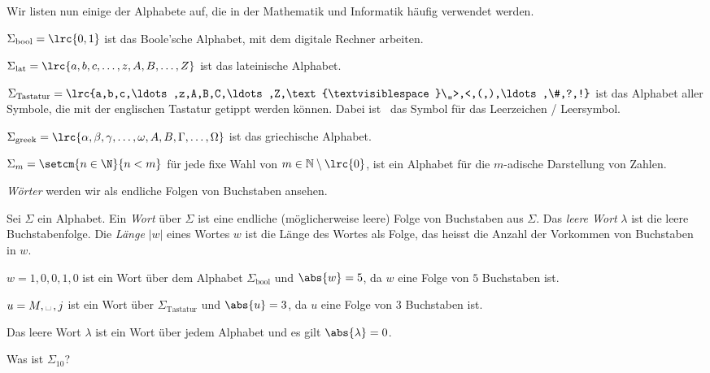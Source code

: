 Wir listen nun einige der Alphabete auf, die in der Mathematik und Informatik häufig verwendet werden.
\begin{myexample}
\begin{aenum}
	\item $\Sigma_{\text{bool}} = \lrc{0,1}$ ist das Boole'sche Alphabet, mit dem digitale Rechner arbeiten.
	\item $\Sigma_{\text{lat}} = \lrc{a,b,c,\ldots ,z,A,B,\ldots ,Z}$ ist das lateinische Alphabet.
	\item $\Sigma_{\text{Tastatur}} = \lrc{a,b,c,\ldots ,z,A,B,C,\ldots ,Z,\text{\textvisiblespace}\,,>,<,(,),\ldots ,\#,?,!}$ ist das Alphabet aller Symbole, die mit der englischen Tastatur getippt werden können. Dabei ist \textvisiblespace\ das Symbol für das Leerzeichen / Leersymbol.
	\item $\Sigma_{\text{greek}} = \lrc{\alpha, \beta, \gamma, \ldots , \omega, A, B, \Gamma, \ldots , \Omega}$ ist das griechische Alphabet.
	\item $\Sigma_m = \setcm{n\in\N}{n<m}$ für jede fixe Wahl von $m\in\mathbb{N}\setminus\lrc{0}$, ist ein Alphabet für die $m$-adische Darstellung von Zahlen.
\end{aenum}
\end{myexample}

\textit{Wörter} werden wir als endliche Folgen von Buchstaben ansehen.
\begin{mydefinition}[Wort]\label{mydefinition:Wort}
Sei $\Sigma$ ein Alphabet. Ein \textit{Wort} über $\Sigma$ ist eine endliche (möglicherweise leere) Folge von Buchstaben aus $\Sigma$. Das \textit{leere Wort} $\lambda$ ist die leere Buchstabenfolge.
Die \textit{Länge} $|w|$ eines Wortes $w$ ist die Länge des Wortes als Folge, das heisst die Anzahl der Vorkommen von Buchstaben in $w$.
\end{mydefinition}

\begin{myexample}
\begin{aenum}
	\item $w = 1,0,0,1,0$ ist ein Wort über dem Alphabet $\Sigma_{\text{bool}}$ und $\abs{w} = 5$, da $w$ eine Folge von $5$ Buchstaben ist.
	\item $u = M,\text{\textvisiblespace}\,, j$ ist ein Wort über $\Sigma_{\text{Tastatur}}$ und $\abs{u} = 3$, da $u$ eine Folge von $3$ Buchstaben ist.
	\item Das leere Wort $\lambda$ ist ein Wort über jedem Alphabet und es gilt $\abs{\lambda} = 0$.
\end{aenum}
\end{myexample}
\begin{myexercise}\label{myexercise:0200}
	Was ist $\Sigma_{10}$?
\end{myexercise}

